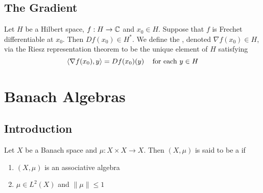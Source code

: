\documentclass{book}
\begin{document}
	
	
	
	
	
	
	\newpage
	\section{The Gradient}
	
	\begin{defn} \ld{}
	Let $H$ be a Hilbert space, $f: H \rightarrow \mathbb{C}$ and $x_0 \in H$. Suppose that $f$ is Frechet differentiable at $x_0$. Then $Df(x_0) \in H^*$. We define the , denoted $\nabla f(x_0) \in H$, via the Riesz representation theorem to be the unique element of $H$ satisfying $$\langle \nabla f(x_0), y \rangle = Df(x_0)(y) \hspace{.3cm} \text{ for each } y \in H$$
	\end{defn}


















































\newpage
\chapter{Banach Algebras}

\section{Introduction}

\begin{defn} \ld{}
	Let $X$ be a Banach space and $\mu: X \times X \rightarrow X$. Then $(X, \mu)$ is said to be a  if
	\begin{enumerate}
		\item $(X, \mu)$ is an associative algebra
		\item $\mu \in L^2(X)$ and $\|\mu\| \leq 1$
	\end{enumerate}
\end{defn}
\end{document}
